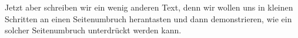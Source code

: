 \documentclass[a5paper]{article}
\begin{document}
\blindtext

\blindtext

Jetzt aber schreiben wir ein wenig anderen Text, denn wir wollen uns in kleinen Schritten an einen
Seitenumbruch herantasten und dann demonstrieren, wie ein solcher Seitenumbruch unterdrückt werden kann.
\end{document}
